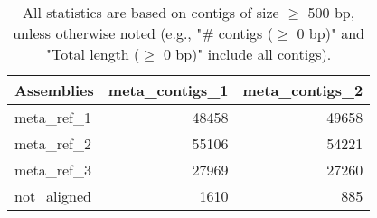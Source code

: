 \documentclass[12pt,a4paper]{article}
\begin{document}
\begin{table}[ht]
\begin{center}
\caption{All statistics are based on contigs of size $\geq$ 500 bp, unless otherwise noted (e.g., "\# contigs ($\geq$ 0 bp)" and "Total length ($\geq$ 0 bp)" include all contigs).}
\begin{tabular}{|l*{2}{|r}|}
\hline
Assemblies & meta\_contigs\_1 & meta\_contigs\_2 \\ \hline
meta\_ref\_1 & 48458 & 49658 \\ \hline
meta\_ref\_2 & 55106 & 54221 \\ \hline
meta\_ref\_3 & 27969 & 27260 \\ \hline
not\_aligned & 1610 & 885 \\ \hline
\end{tabular}
\end{center}
\end{table}
\end{document}
